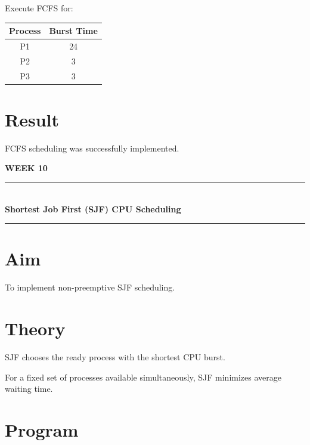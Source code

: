 \documentclass[12pt,a4paper]{report}
\newcommand{\experimenttitle}[2]{
\clearpage
\begin{center}
{\Large\bfseries\color{univblue} WEEK #1}\\[0.15cm]
\rule{\textwidth}{1pt}\\[0.2cm]
{\LARGE\bfseries #2}\\[0.2cm]
\rule{\textwidth}{1pt}
\end{center}
\vspace{0.4cm}
}
\begin{document}
Execute FCFS for:

\begin{center}
\begin{tabular}{|c|c|}
\hline
Process & Burst Time \\
\hline
P1 & 24 \\
P2 & 3 \\
P3 & 3 \\
\hline
\end{tabular}
\end{center}

\section*{Result}

FCFS scheduling was successfully implemented.


\experimenttitle{10}{Shortest Job First (SJF) CPU Scheduling}

\section*{Aim}

To implement non-preemptive SJF scheduling.

\section*{Theory}

SJF chooses the ready process with the shortest CPU burst.

For a fixed set of processes available simultaneously, SJF minimizes average
waiting time.

\section*{Program}
\end{document}
